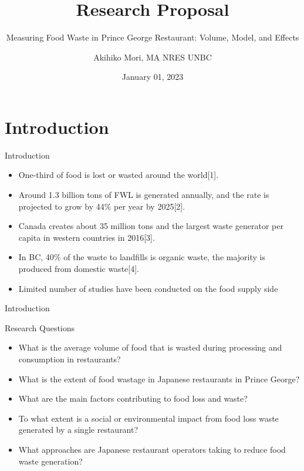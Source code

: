 \documentclass[
  ignorenonframetext,
]{beamer}
\title{Research Proposal}
\subtitle{Measuring Food Waste in Prince George Restaurant: Volume,
Model, and Effects}
\author{Akihiko Mori, MA NRES UNBC}
\date{January 01, 2023}
\providecommand{\tightlist}{%
  \setlength{\itemsep}{0pt}\setlength{\parskip}{0pt}}
\begin{document}
\frame{\titlepage}

\begin{frame}[allowframebreaks]
  \tableofcontents[hideallsubsections]
\end{frame}
\hypertarget{introduction}{%
\section{Introduction}\label{introduction}}

\begin{frame}{Introduction}
\protect\hypertarget{introduction-1}{}
\begin{itemize}
\tightlist
\item
  One-third of food is lost or wasted around the world{[}1{]}.
\end{itemize}

\begin{itemize}
\tightlist
\item
  Around 1.3 billion tons of FWL is generated annually, and the rate is
  projected to grow by 44\% per year by 2025{[}2{]}.
\item
  Canada creates about 35 million tons and the largest waste generator
  per capita in western countries in 2016{[}3{]}.
\end{itemize}

\begin{itemize}
\tightlist
\item
  In BC, 40\% of the waste to landfills is organic waste, the majority
  is produced from domestic waste{[}4{]}.
\end{itemize}

\begin{itemize}
\tightlist
\item
  Limited number of studies have been conducted on the food supply side
\end{itemize}
\end{frame}

\begin{frame}{Introduction}
\protect\hypertarget{introduction-2}{}
\begin{block}{Research Questions}
\protect\hypertarget{research-questions}{}
\begin{itemize}
\tightlist
\item
  What is the average volume of food that is wasted during processing
  and consumption in restaurants?
\item
  What is the extent of food wastage in Japanese restaurants in Prince
  George?
\item
  What are the main factors contributing to food loss and waste?
\item
  To what extent is a social or environmental impact from food loss
  waste generated by a single restaurant?
\item
  What approaches are Japanese restaurant operators taking to reduce
  food waste generation?
\end{itemize}
\end{block}
\end{frame}
\end{document}
